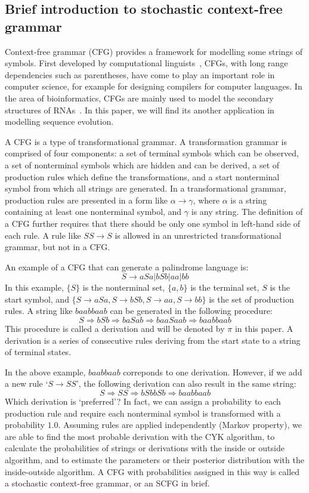 \documentclass[pdftex,11pt]{article}
\begin{document}
\subsection{Brief introduction to stochastic context-free grammar}
Context-free grammar (CFG) provides a framework for modelling some
strings of symbols.  First developed by computational
linguists~\citep{scfg-chomsky56}, CFGs, with long range dependencies such
as parentheses, have come to play an important role in computer science,
for example for designing compilers for computer languages. In the area
of bioinformatics, CFGs are mainly used to model the secondary
structures of RNAs~\citep{scfg-eddy94,durbin98}. In this paper, we will
find its another application in modelling sequence evolution.

A CFG is a type of transformational grammar. A transformation grammar is
comprised of four components: a set of terminal symbols which can be
observed, a set of nonterminal symbols which are hidden and can be
derived, a set of production rules which define the transformations, and
a start nonterminal symbol from which all strings are generated.  In a
transformational grammar, production rules are presented in a form like
$\alpha\rightarrow\gamma$, where $\alpha$ is a string containing at
least one nonterminal symbol, and $\gamma$ is any string.  The
definition of a CFG further requires that there should be only one
symbol in left-hand side of each rule.  A rule like $SS\rightarrow S$ is
allowed in an unrestricted transformational grammar, but not in a CFG.

An example of a CFG that can generate a palindrome language is:
\[
S\rightarrow aSa|bSb|aa|bb
\]
In this example, $\{S\}$ is the nonterminal set, $\{a,b\}$ is the
terminal set, $S$ is the start symbol, and $\{S\rightarrow
aSa,S\rightarrow bSb,S\rightarrow aa,S\rightarrow bb\}$ is the set of
production rules.  A string like $baabbaab$ can be generated in the
following procedure:
\[
S\Rightarrow bSb\Rightarrow baSab\Rightarrow baaSaab\Rightarrow baabbaab
\]
This procedure is called a derivation and will be denoted by $\pi$ in
this paper.  A derivation is a series of consecutive rules deriving from
the start state to a string of terminal states.

In the above example, $baabbaab$ correponds to one derivation. However,
if we add a new rule `$S\rightarrow SS$', the following derivation can
also result in the same string:
\[
S\Rightarrow SS\Rightarrow bSbbSb\Rightarrow baabbaab
\]
Which derivation is `preferred'? In fact, we can assign a probability to
each production rule and require each nonterminal symbol is transformed
with a probability $1.0$.  Assuming rules are applied independently
(Markov property), we are able to find the most probable derivation with
the CYK algorithm, to calculate the probabilities of strings or
derivations with the inside or outside algorithm, and to estimate the
parameters or their posterior distribution with the inside-outside
algorithm.  A CFG with probabilities assigned in this way is called a
stochastic context-free grammar, or an SCFG in brief.
\end{document}
